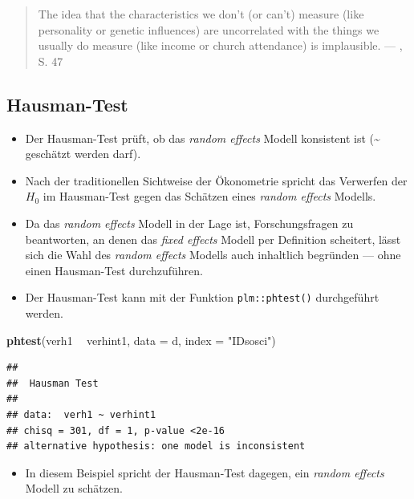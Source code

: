\documentclass[
]{book}
\newenvironment{Shaded}{\begin{snugshade}}{\end{snugshade}}
\newcommand{\DataTypeTok}[1]{\textcolor[rgb]{0.13,0.29,0.53}{#1}}
\newcommand{\KeywordTok}[1]{\textcolor[rgb]{0.13,0.29,0.53}{\textbf{#1}}}
\newcommand{\NormalTok}[1]{#1}
\newcommand{\OperatorTok}[1]{\textcolor[rgb]{0.81,0.36,0.00}{\textbf{#1}}}
\newcommand{\StringTok}[1]{\textcolor[rgb]{0.31,0.60,0.02}{#1}}
\providecommand{\tightlist}{%
  \setlength{\itemsep}{0pt}\setlength{\parskip}{0pt}}
\begin{document}
\begin{quote}
The idea that the characteristics we don't (or can't) measure (like personality or genetic influences) are uncorrelated with the things we usually do measure (like income or church attendance) is implausible. --- \citet{vaiseyWhatYouCan2017}, S. 47
\end{quote}

\hypertarget{hausman-test}{%
\subsection*{Hausman-Test}\label{hausman-test}}

\begin{itemize}
\tightlist
\item
  Der Hausman-Test prüft, ob das \emph{random effects} Modell konsistent ist (\textasciitilde{} geschätzt werden darf).
\item
  Nach der traditionellen Sichtweise der Ökonometrie spricht das Verwerfen der \(H_0\) im Hausman-Test gegen das Schätzen eines \emph{random effects} Modells.
\item
  Da das \emph{random effects} Modell in der Lage ist, Forschungsfragen zu beantworten, an denen das \emph{fixed effects} Modell per Definition scheitert, lässt sich die Wahl des \emph{random effects} Modells auch inhaltlich begründen --- ohne einen Hausman-Test durchzuführen.
\item
  Der Hausman-Test kann mit der Funktion \texttt{plm::phtest()} durchgeführt werden.
\end{itemize}

\begin{Shaded}
\begin{Highlighting}[]
\KeywordTok{phtest}\NormalTok{(verh1 }\OperatorTok{~}\StringTok{ }\NormalTok{verhint1, }\DataTypeTok{data =}\NormalTok{ d, }\DataTypeTok{index =} \StringTok{"IDsosci"}\NormalTok{)}
\end{Highlighting}
\end{Shaded}

\begin{verbatim}
## 
##  Hausman Test
## 
## data:  verh1 ~ verhint1
## chisq = 301, df = 1, p-value <2e-16
## alternative hypothesis: one model is inconsistent
\end{verbatim}

\begin{itemize}
\tightlist
\item
  In diesem Beispiel spricht der Hausman-Test dagegen, ein \emph{random effects} Modell zu schätzen.
\end{itemize}
\end{document}
